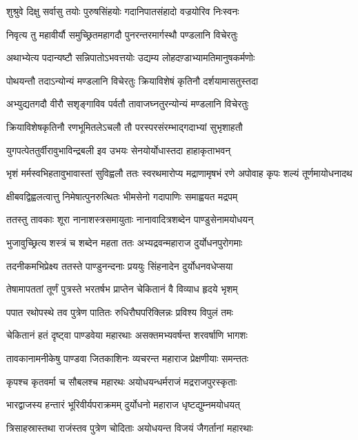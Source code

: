\twolineshloka
{शुश्रुवे दिक्षु सर्वासु तयोः पुरुषसिंहयोः}
{गदानिपातसंहादो वज्रयोरिव निःस्वनः}


\twolineshloka
{निवृत्य तु महावीर्यौ समुच्छ्रितमहागदौ}
{पुनरन्तरमार्गस्थौ पण्डलानि विचेरतुः}


\twolineshloka
{अथाभ्येत्य पदान्यष्टौ सन्निपातोऽभवत्तयोः}
{उद्यम्य लोहदण़्डाभ्यामतिमानुषकर्मणोः}


\twolineshloka
{पोथयन्तौ तदाऽन्योन्यं मण्डलानि विचेरतुः}
{क्रियाविशेषं कृतिनौ दर्शयामासतुस्तदा}


\twolineshloka
{अभ्युद्यतगदौ वीरौ सशृङ्गाविव पर्वतौ}
{तावाजघ्नतुरन्योन्यं मण्डलानि विचेरतुः}


\twolineshloka
{क्रियाविशेषकृतिनौ रणभूमितलेऽचलौ}
{तौ परस्परसंरम्भाद्गदाभ्यां सुभृशाहतौ}


\twolineshloka
{युगपत्पेततुर्वीरावुभाविन्द्रबली इव}
{उभयः सेनयोर्योधास्तदा हाहाकृताभवन्}


भृशं मर्मस्वभिहतावुभावास्तां सुविह्वलौ
\twolineshloka
{ततः स्वरथमारोप्य मद्राणामृषभं रणे}
{अपोवाह कृपः शल्यं तूर्णमायोधनादथ}


\twolineshloka
{क्षीबवद्विह्वलत्वात्तु निमेषात्पुनरुत्थितः}
{भीमसेनो गदापाणिः समाह्वयत मद्रपम्}


\twolineshloka
{ततस्तु तावकाः शूरा नानाशस्त्रसमायुताः}
{नानावादित्रशब्देन पाण्डुसेनामयोधयन्}


\twolineshloka
{भुजावुच्छ्रित्य शस्त्रं च शब्देन महता ततः}
{अभ्यद्रवन्महाराज दुर्योधनपुरोगमाः}


\twolineshloka
{तदनीकमभिप्रेक्ष्य ततस्ते पाण्डुनन्दनाः}
{प्रययुः सिंहनादेन दुर्योधनवधेप्सया}


\twolineshloka
{तेषामापततां तूर्णं पुत्रस्ते भरतर्षभ}
{प्राप्तेन चेकितानं वै विव्याध हृदये भृशम्}


\twolineshloka
{पपात रथोपस्थे तव पुत्रेण पातितः}
{रुधिरौघपरिक्लिन्नः प्रविश्य विपुलं तमः}


\twolineshloka
{चेकितानं हतं दृष्ट्वा पाण्डवेया महारथाः}
{असक्तमभ्यवर्षन्त शरवर्षाणि भागशः}


\twolineshloka
{तावकानामनीकेषु पाण्डवा जितकाशिनः}
{व्यचरन्त महाराज प्रेक्षणीयाः समन्ततः}


\twolineshloka
{कृपश्च कृतवर्मा च सौबलश्च महारथः}
{अयोधयन्धर्मराजं मद्रराजपुरस्कृताः}


\twolineshloka
{भारद्वाजस्य हन्तारं भूरिवीर्यपराक्रमम्}
{दुर्योधनो महाराज धृष्टद्युम्नमयोधयत्}


\twolineshloka
{त्रिसाहस्रास्तथा राजंस्तव पुत्रेण चोदिताः}
{अयोधयन्त विजयं जैगर्तानां महारथाः}


